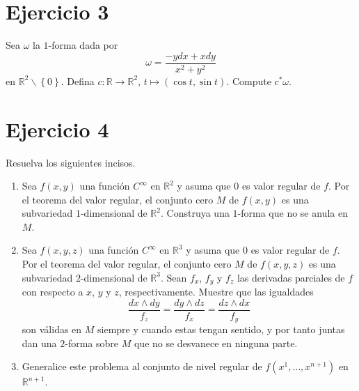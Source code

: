 \documentclass[12pt]{report}
\theoremstyle{largebreak}
\newcommand\cf[3]{\ensuremath{#1:#2\rightarrow#3}}
\begin{document}
    \newpage

    \section{Ejercicio 3}

    \begin{excer}
        Sea $\omega$ la $1$-forma dada por
        \begin{equation*}
            \omega = \frac{-ydx+xdy}{x^2+y^2}
        \end{equation*}
        en $\mathbb{R}^2\backslash\left\{0\right\}$. Defina $\cf{c}{\mathbb{R}}{\mathbb{R}^2}$, $t\mapsto (\cos t,\sin t)$. Compute $c^*\omega$.
    \end{excer}

    \newpage

    \renewcommand{\theenumi}{\alph{enumi}}
    \renewcommand{\labelenumi}{{(\theenumi)}}

    \section{Ejercicio 4}

    \begin{excer}
        Resuelva los siguientes incisos.
        \begin{enumerate}
            \item Sea $f(x,y)$ una función $C^\infty$ en $\mathbb{R}^2$ y asuma que $0$ es valor regular de $f$. Por el teorema del valor regular, el conjunto cero $M$ de $f(x,y)$ es una subvariedad $1$-dimensional de $\mathbb{R}^2$. Construya una $1$-forma que no se anula en $M$.
            \item Sea $f(x,y,z)$ una función $C^\infty$ en $\mathbb{R}^3$ y asuma que $0$ es valor regular de $f$. Por el teorema del valor regular, el conjunto cero $M$ de $f(x,y,z)$ es una subvariedad $2$-dimensional de $\mathbb{R}^3$. Sean $f_x$, $f_y$ y $f_z$ las derivadas parciales de $f$ con respecto a $x$, $y$ y $z$, respectivamente. Muestre que las igualdades
            \begin{equation*}
                \frac{dx\wedge dy}{f_z}=\frac{dy\wedge dz}{f_x}=\frac{dz\wedge dx}{f_y}
            \end{equation*}
            son válidas en $M$ siempre y cuando estas tengan sentido, y por tanto juntas dan una $2$-forma sobre $M$ que no se desvanece en ninguna parte.
            \item Generalice este problema al conjunto de nivel regular de $f(x^1,\dots,x^{n+1})$ en $\mathbb{R}^{n+1}$.
        \end{enumerate}
    \end{excer}
\end{document}
